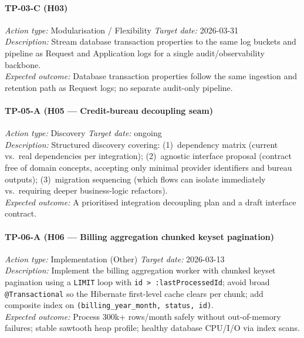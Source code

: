 \paragraph{TP-03-C \textnormal{(H03)}}
\textit{Action type:} Modularisation / Flexibility \quad \textit{Target date:} 2026-03-31 \\
\textit{Description:} Stream database transaction properties to the same log
buckets and pipeline as Request and Application logs for a single
audit/observability backbone. \\
\textit{Expected outcome:} Database transaction properties follow the same
ingestion and retention path as Request logs; no separate audit-only pipeline.

\paragraph{TP-05-A \textnormal{(H05 — Credit-bureau decoupling seam)}}
\textit{Action type:} Discovery \quad \textit{Target date:} ongoing \\
\textit{Description:} Structured discovery covering: (1)~dependency matrix
(current vs.\ real dependencies per integration); (2)~agnostic interface
proposal (contract free of domain concepts, accepting only minimal provider
identifiers and bureau outputs); (3)~migration sequencing (which flows can
isolate immediately vs.\ requiring deeper business-logic refactors). \\
\textit{Expected outcome:} A prioritised integration decoupling plan and a
draft interface contract.

\paragraph{TP-06-A \textnormal{(H06 — Billing aggregation chunked keyset pagination)}}
\textit{Action type:} Implementation (Other) \quad \textit{Target date:} 2026-03-13 \\
\textit{Description:} Implement the billing aggregation worker with chunked
keyset pagination using a \texttt{LIMIT} loop with
\texttt{id > :lastProcessedId}; avoid broad \texttt{@Transactional} so the
Hibernate first-level cache clears per chunk; add composite index on
\texttt{(billing\_year\_month, status, id)}. \\
\textit{Expected outcome:} Process 300k+ rows/month safely without
out-of-memory failures; stable sawtooth heap profile; healthy database
CPU/I/O via index scans.


